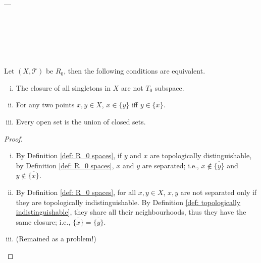 \

\

\

---

\

\

\







\begin{proposition}
	\label{prop: alternative definitions of R_0 spaces}
	Let $(X, \mathcal T)$ be $R_0$, then the following conditions are equivalent.
	\begin{enumerate}[(i)]
		\item
		The closure of all singletons in $X$ are not $T_0$ subspace.
		
		\item
		For any two points $x,y \in X$, $x \in \overline{ \{y\} }$ iff $y \in \overline{ \{x\} }$.
		
		\item
		Every open set is the union of closed sets.
	\end{enumerate}
	
	\begin{proof}
		\
		\begin{enumerate}[(i)]
			\item
			By Definition \ref{def: R_0 spaces}, if $y$ and $x$ are topologically distinguishable, by Definition \ref{def: R_0 spaces}, $x$ and $y$ are separated; i.e., $x \notin \overline {\{y\}}$ and $y \notin \overline{\{x\}}$.
			
			\item
			By Definition \ref{def: R_0 spaces}, for all $x,y \in X$, $x,y$ are not separated only if they are topologically indistinguishable. By Definition \ref{def: topologically indistinguishable}, they share all their neighbourhoods, thus they have the same closure; i.e., $\overline{\{x\}} = \overline{\{y\}}$.
			
			\item
			(Remained as a problem!)
		\end{enumerate}
	\end{proof}
\end{proposition}







